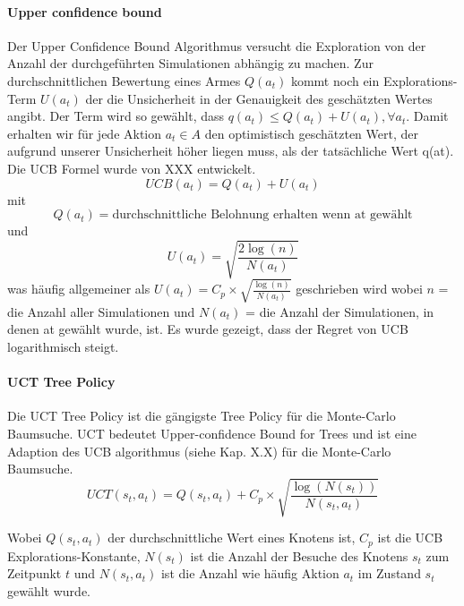 \paragraph{Upper confidence bound}
Der Upper Confidence Bound Algorithmus versucht die Exploration von der Anzahl der durchgeführten Simulationen abhängig zu machen. Zur durchschnittlichen Bewertung eines Armes $Q(a_t)$ kommt noch ein Explorations-Term $U(a_t)$ der die Unsicherheit in der Genauigkeit des geschätzten Wertes angibt. Der Term wird so gewählt, dass $q(a_t) \le Q(a_t) + U(a_t), \forall a_t$. Damit erhalten wir für jede Aktion $a_t\in A$ den optimistisch geschätzten Wert, der aufgrund unserer Unsicherheit höher liegen muss, als der tatsächliche Wert q(at).\\
Die UCB Formel wurde von XXX entwickelt.
\begin{equation}
UCB(a_t) = Q(a_t) + U(a_t)
\end{equation}
mit
\begin{equation}
Q(a_t) = \textrm{durchschnittliche Belohnung erhalten wenn at gewählt}
\end{equation}
und 
\begin{equation}
U(a_t) = \sqrt{
	\frac{2\log(n)}{N(a_t)}
}
\end{equation}
 was häufig allgemeiner als $U(a_t) = C_p \times \sqrt{
 	\frac{\log(n)}
 	{N(a_t)}
}$ geschrieben wird
wobei $n$ = die Anzahl aller Simulationen und $N(a_t)$ = die Anzahl der Simulationen, in denen at gewählt wurde, ist.
Es wurde gezeigt, dass der Regret von UCB logarithmisch steigt.

\paragraph{UCT Tree Policy}
Die UCT Tree Policy ist die gängigste Tree Policy für die Monte-Carlo Baumsuche. UCT bedeutet Upper-confidence Bound for Trees und ist eine Adaption des UCB algorithmus (siehe Kap. X.X) für die Monte-Carlo Baumsuche.
\begin{equation}
UCT(s_t,a_t) = Q(s_t, a_t) + C_p \times \sqrt{
	\frac{\log(N(s_t))}
	{N(s_t,a_t)}
}
\end{equation}


Wobei $Q(s_t,a_t)$ der durchschnittliche Wert eines Knotens ist, $C_p$ ist die UCB Explorations-Konstante, $N(s_t)$ ist die Anzahl der Besuche des Knotens $s_t$ zum Zeitpunkt $t$ und $N(s_t,a_t)$ ist die Anzahl wie häufig Aktion $a_t$ im Zustand $s_t$ gewählt wurde.

